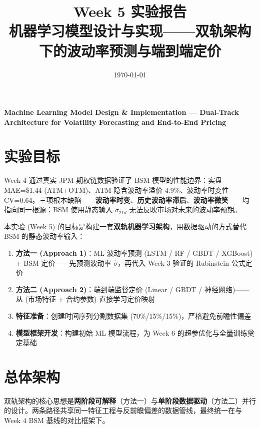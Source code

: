 \documentclass[a4paper,11pt]{article}
\title{\textbf{Week 5 实验报告}\\[4pt]
       \large 机器学习模型设计与实现——双轨架构下的波动率预测与端到端定价}
\author{}
\date{\today}
\begin{document}
\maketitle
\thispagestyle{empty}
\vspace{0.5cm}
\begin{center}
    \large \textbf{Machine Learning Model Design \& Implementation --- Dual-Track
    Architecture for Volatility Forecasting and End-to-End Pricing}
\end{center}
\vspace{1cm}

\section{实验目标}

Week 4 通过真实 JPM 期权链数据验证了 BSM 模型的性能边界：实盘 MAE=\$1.44 (ATM+OTM)、ATM 隐含波动率溢价 4.9\%、波动率时变性 CV=0.64。三项根本缺陷——\textbf{波动率时变}、\textbf{历史波动率滞后}、\textbf{波动率微笑}——均指向同一根源：BSM 使用静态输入 $\sigma_{21d}$ 无法反映市场对未来的波动率预期。

本实验 (Week 5) 的目标是构建一套\textbf{双轨机器学习架构}，用数据驱动的方式替代 BSM 的静态波动率输入：

\begin{enumerate}
    \item \textbf{方法一 (Approach 1)}：ML 波动率预测 (LSTM / RF / GBDT / XGBoost) + BSM 定价——先预测波动率 $\hat{\sigma}$，再代入 Week 3 验证的 Rubinstein 公式定价
    \item \textbf{方法二 (Approach 2)}：端到端监督定价 (Linear / GBDT / 神经网络)——从 (市场特征 + 合约参数) 直接学习定价映射
    \item \textbf{特征准备}：创建时间序列分割数据集 (70\%/15\%/15\%)，严格避免前瞻性偏差
    \item \textbf{模型框架开发}：构建初始 ML 模型流程，为 Week 6 的超参优化与全量训练奠定基础
\end{enumerate}

\section{总体架构}

双轨架构的核心思想是\textbf{两阶段可解释}（方法一）与\textbf{单阶段数据驱动}（方法二）并行的设计。两条路径共享同一特征工程与反前瞻偏差的数据管线，最终统一在与 Week 4 BSM 基线的对比框架下。
\end{document}
